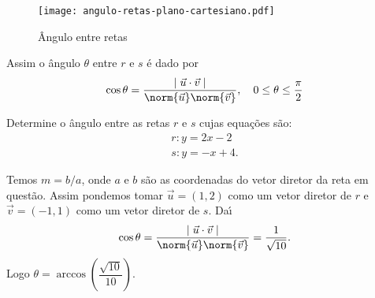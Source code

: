 \begin{figure}[!h]
  \centering
  \caption{\^Angulo entre retas}
  \texttt{[image: angulo-retas-plano-cartesiano.pdf]}



\end{figure}

Assim o \^angulo $\theta$ entre $r$ e $s$ \'e dado por
\[
  \cos\theta = \dfrac{\mid\vec{u}\cdot\vec{v}\mid}{\norm{\vec{u}}\norm{\vec{v}}},\quad 0 \le \theta \le \dfrac{\pi}{2}
\]

\begin{exemplos}
  Determine o \^angulo entre as retas $r$ e $s$ cujas equa\c{c}\~oes s\~ao:
  \begin{align*}
    r: y = 2x -2\\
    s: y = -x + 4.
  \end{align*}
  \begin{solucao}
    Temos $m = b/a$, onde $a$ e $b$ s\~ao as coordenadas do vetor diretor da reta em quest\~ao. Assim pondemos tomar $\vec{u} = (1,2)$ como um vetor diretor de $r$ e $\vec{v} = (-1,1)$ como um vetor diretor de $s$. Da{\'\i}
    \[
      \cos\theta = \dfrac{\mid\vec{u}\cdot\vec{v}\mid}{\norm{\vec{u}}\norm{\vec{v}}} = \dfrac{1}{\sqrt{10}}.
    \]
    Logo $\theta = \arccos\left(\dfrac{\sqrt{10}}{10}\right)$.
  \end{solucao}
\end{exemplos}

